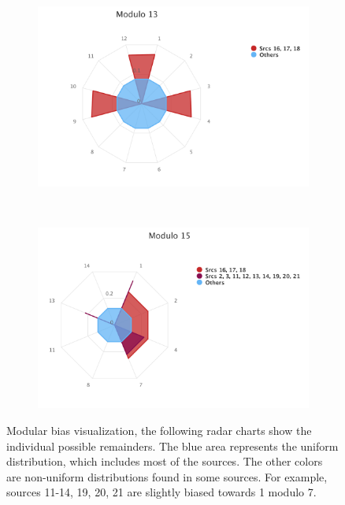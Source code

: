 \begin{figure}[ht]
\centering
\begin{subfigure}{0.9\textwidth}
	\includegraphics[width=\linewidth]{tex/images/analysis/mod13}
\end{subfigure}\\

\begin{subfigure}{0.9\textwidth}
	\includegraphics[width=\linewidth]{tex/images/analysis/mod15}
\end{subfigure}
\caption{Modular bias visualization, the following radar charts show the individual possible remainders. The blue area represents the uniform distribution, which includes most of the sources. The other colors are non-uniform distributions found in some sources. For example, sources 11-14, 19, 20, 21 are slightly biased towards 1 modulo 7.}
\end{figure}


